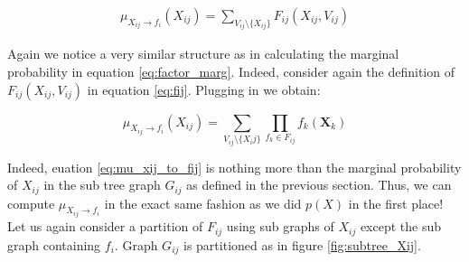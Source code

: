 \begin{equation}\label{eq:message_var_to_fact_}\begin{split}
\mu_{X_{ij} \rightarrow f_i}(X_{ij}) = \sum_{V_{ij} \setminus \{X_{ij}\}}
			F_{ij}(X_{ij}, V_{ij})
\end{split}\end{equation}

\noindent
Again we notice a very similar structure as in calculating the marginal
probability in equation \ref{eq:factor_marg}. Indeed, consider again 
the definition of $F_{ij}(X_{ij}, V_{ij})$ in equation \ref{eq:fij}.
Plugging in we obtain:

\begin{equation}\label{eq:mu_xij_to_fij}
\mu_{X_{ij} \rightarrow f_i}(X_{ij}) = \sum_{V_{ij}\setminus \{X_ij\}}
\prod_{f_k \in F_{ij}} f_k(\textbf{X}_k)
\end{equation}

\noindent
Indeed, euation \ref{eq:mu_xij_to_fij} is nothing more than the 
marginal probability of $X_{ij}$ in the sub tree graph $G_{ij}$
as defined in the previous section. Thus, we can compute 
$\mu_{X_{ij} \rightarrow f_i}$ in the exact same fashion as we did
$p(X)$ in the first place! Let us again consider a partition of 
$F_{ij}$ using sub graphs of $X_{ij}$ except the sub graph
containing $f_i$. Graph $G_{ij}$ is partitioned as in figure
\ref{fig:subtree_Xij}.

